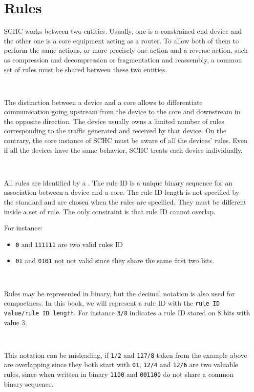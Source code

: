 
\chapter{Rules}

SCHC works between two entities. Usually, one is a constrained end-device and the other one is a core equipment acting as a router. To allow both of them to perform the same actions, or more precisely one action and a reverse action, such as compression and decompression or fragmentation and reassembly, a common set of rules must be shared between these two entities.

~

The distinction between a device and a core allows to differentiate communication going upstream from the device to the core and downstream in the opposite direction. The device usually owns a limited number of rules corresponding to the traffic  generated and received by that device. On the contrary, the core instance of SCHC must be aware of all the devices' rules. Even if all the devices have the same behavior, SCHC treats each device individually. 

~~

All rules are identified by a . The rule ID is a unique binary sequence for an association between a device and a core. The rule ID length is not specified by the standard and are chosen when the rules are specified. They must be different inside a set of rule. The only constraint is that rule ID cannot overlap.

For instance:

\begin{itemize}
\item\texttt{0} and \texttt{111111} are two valid rules ID
\item \texttt{01} and \texttt{0101} not not valid since they share the same first two bits.
\end{itemize}

~


Rules may be represented in binary, but the decimal notation is also used for compactness. In this book, we will represent a rule ID with the \texttt{rule ID value/rule ID length}. For instance \texttt{3/8} indicates a rule ID stored on 8 bits with value 3.

~

This notation can be misleading, if \texttt{1/2} and \texttt{127/8} taken from the example above are overlapping since they both start with \texttt{01}, \texttt{12/4} and \texttt{12/6} are two valuable rules, since when written in binary \texttt{1100} and \texttt{001100} do not share a common binary sequence.

